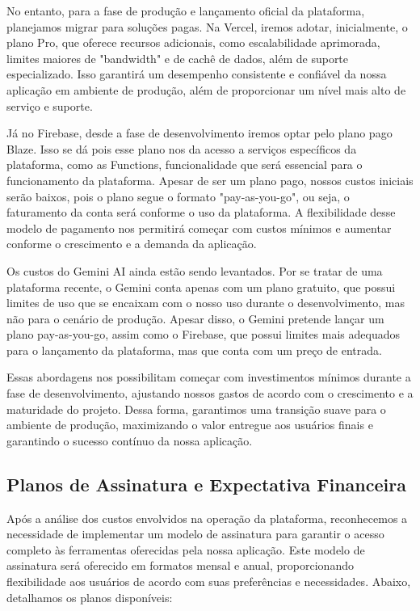No entanto, para a fase de produção e lançamento oficial da plataforma, planejamos migrar para soluções pagas. Na Vercel, iremos adotar, inicialmente, o plano Pro, que oferece recursos adicionais, como escalabilidade aprimorada, limites maiores de "bandwidth" e de cachê de dados, além de suporte especializado. Isso garantirá um desempenho consistente e confiável da nossa aplicação em ambiente de produção, além de proporcionar um nível mais alto de serviço e suporte.

Já no Firebase, desde a fase de desenvolvimento iremos optar pelo plano pago Blaze. Isso se dá pois esse plano nos da acesso a serviços específicos da plataforma, como as Functions, funcionalidade que será essencial para o funcionamento da plataforma. Apesar de ser um plano pago, nossos custos iniciais serão baixos, pois o plano segue o formato "pay-as-you-go", ou seja, o faturamento da conta será conforme o uso da plataforma. A flexibilidade desse modelo de pagamento nos permitirá começar com custos mínimos e aumentar conforme o crescimento e a demanda da aplicação.

Os custos do Gemini AI ainda estão sendo levantados. Por se tratar de uma plataforma recente, o Gemini conta apenas com um plano gratuito, que possui limites de uso que se encaixam com o nosso uso durante o desenvolvimento, mas não para o cenário de produção. Apesar disso, o Gemini pretende lançar um plano pay-as-you-go, assim como o Firebase, que possui limites mais adequados para o lançamento da plataforma, mas que conta com um preço de entrada. 

Essas abordagens nos possibilitam começar com investimentos mínimos durante a fase de desenvolvimento, ajustando nossos gastos de acordo com o crescimento e a maturidade do projeto. Dessa forma, garantimos uma transição suave para o ambiente de produção, maximizando o valor entregue aos usuários finais e garantindo o sucesso contínuo da nossa aplicação.

\subsection{Planos de Assinatura e Expectativa Financeira}

Após a análise dos custos envolvidos na operação da plataforma, reconhecemos a necessidade de implementar um modelo de assinatura para garantir o acesso completo às ferramentas oferecidas pela nossa aplicação. Este modelo de assinatura será oferecido em formatos mensal e anual, proporcionando flexibilidade aos usuários de acordo com suas preferências e necessidades. Abaixo, detalhamos os planos disponíveis:

